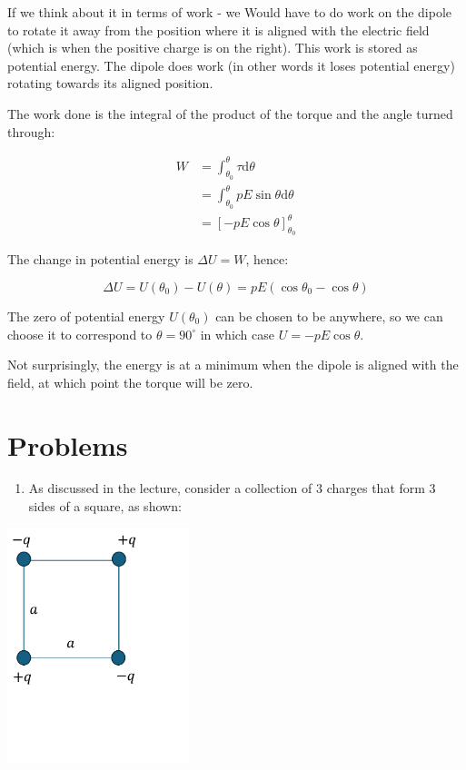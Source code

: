 \documentclass[
  letterpaper,
  DIV=11,
  numbers=noendperiod]{scrreprt}
\providecommand{\tightlist}{%
  \setlength{\itemsep}{0pt}\setlength{\parskip}{0pt}}\usepackage{longtable,booktabs,array}
\begin{document}
If we think about it in terms of work - we Would have to do work on the
dipole to rotate it away from the position where it is aligned with the
electric field (which is when the positive charge is on the right). This
work is stored as potential energy. The dipole does work (in other words
it loses potential energy) rotating towards its aligned position.

The work done is the integral of the product of the torque and the angle
turned through:

\[
\begin{split} 
W & = \int_{\theta_0}^{\theta} \tau \mathrm{d} \theta \\
& = \int_{\theta_0}^{\theta} pE\sin\theta \mathrm{d} \theta \\
& = [-pE \cos \theta]_{\theta_0}^{\theta} 
\end{split}
\]

The change in potential energy is \(\Delta U = W\), hence:

\[ \Delta U = U(\theta_0) - U (\theta) = pE(\cos\theta_0 - \cos\theta) \]

The zero of potential energy \(U(\theta_0)\) can be chosen to be
anywhere, so we can choose it to correspond to \(\theta = 90^{\circ}\)
in which case \(U = -pE\cos\theta\).

Not surprisingly, the energy is at a minimum when the dipole is aligned
with the field, at which point the torque will be zero.

\section{Problems}\label{problems-2}

\begin{enumerate}
\def\labelenumi{\arabic{enumi})}
\tightlist
\item
  As discussed in the lecture, consider a collection of 3 charges that
  form 3 sides of a square, as shown:
\end{enumerate}

\includegraphics[width=2.08333in,height=\textheight]{Figures/L3_3charges.png}
\end{document}
